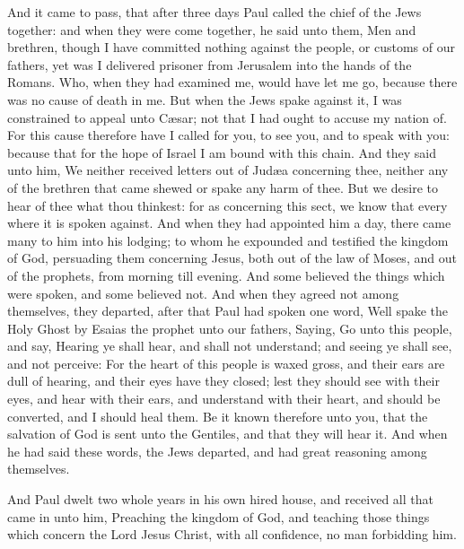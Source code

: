  And it came to pass, that after three days Paul called the
chief of the Jews together: and when they were come together, he said
unto them, Men and brethren, though I have committed nothing against the
people, or customs of our fathers, yet was I delivered prisoner from
Jerusalem into the hands of the Romans.  Who, when they had
examined me, would have let me go, because there was no cause of death
in me.  But when the Jews spake against it, I was
constrained to appeal unto Cæsar; not that I had ought to accuse my
nation of.  For this cause therefore have I called for you,
to see you, and to speak with you: because that for the hope of Israel I
am bound with this chain.  And they said unto him, We
neither received letters out of Judæa concerning thee, neither any of
the brethren that came shewed or spake any harm of thee. 
But we desire to hear of thee what thou thinkest: for as concerning this
sect, we know that every where it is spoken against.  And
when they had appointed him a day, there came many to him into his
lodging; to whom he expounded and testified the kingdom of God,
persuading them concerning Jesus, both out of the law of Moses, and out
of the prophets, from morning till evening.  And some
believed the things which were spoken, and some believed not.
 And when they agreed not among themselves, they departed,
after that Paul had spoken one word, Well spake the Holy Ghost by Esaias
the prophet unto our fathers,  Saying, Go unto this people,
and say, Hearing ye shall hear, and shall not understand; and seeing ye
shall see, and not perceive:  For the heart of this people
is waxed gross, and their ears are dull of hearing, and their eyes have
they closed; lest they should see with their eyes, and hear with their
ears, and understand with their heart, and should be converted, and I
should heal them.  Be it known therefore unto you, that the
salvation of God is sent unto the Gentiles, and that they will hear it.
 And when he had said these words, the Jews departed, and
had great reasoning among themselves.

 And Paul dwelt two whole years in his own hired house, and
received all that came in unto him,  Preaching the kingdom
of God, and teaching those things which concern the Lord Jesus Christ,
with all confidence, no man forbidding him.
